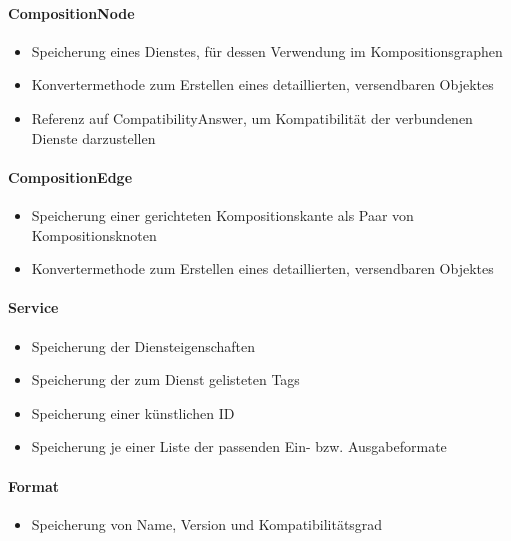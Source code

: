 \paragraph{CompositionNode}
\begin{itemize}
	\item Speicherung eines Dienstes, für dessen Verwendung im Kompositionsgraphen
	\item Konvertermethode zum Erstellen eines detaillierten, versendbaren Objektes
	\item Referenz auf CompatibilityAnswer, um Kompatibilität der verbundenen Dienste darzustellen
\end{itemize} 
\paragraph{CompositionEdge} 
\begin{itemize}
	\item Speicherung einer gerichteten Kompositionskante als Paar von Kompositionsknoten
	\item Konvertermethode zum Erstellen eines detaillierten, versendbaren Objektes
\end{itemize}

\paragraph{Service}
\begin{itemize}
	\item Speicherung der Diensteigenschaften
	\item Speicherung der zum Dienst gelisteten Tags
	\item Speicherung einer künstlichen ID
	\item Speicherung je einer Liste der passenden Ein- bzw. Ausgabeformate
\end{itemize} 
\paragraph{Format}
\begin{itemize}
	\item Speicherung von Name, Version und Kompatibilitätsgrad
\end{itemize} 

